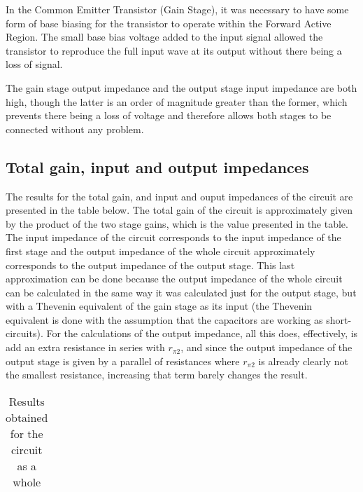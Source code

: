 In the Common Emitter Transistor (Gain Stage), it was necessary to have some form of base biasing for the transistor to operate within the Forward Active Region. The small base bias voltage added to the input signal allowed the transistor to reproduce the full input wave at its output without there being a loss of signal.

The gain stage output impedance and the output stage input impedance are both high, though the latter is an order of magnitude greater than the former, which prevents there being a loss of voltage and therefore allows both stages to be connected without any problem.



\subsection{Total gain, input and output impedances}

The results for the total gain, and input and ouput impedances of the circuit are presented in the table below. The total gain of the circuit is approximately given by the product of the two stage gains, which is the value presented in the table. The input impedance of the circuit corresponds to the input impedance of the first stage and the output impedance of the whole circuit approximately corresponds to the output impedance of the output stage.
This last approximation can be done because the output impedance of the whole circuit can be calculated in the same way it was calculated just for the output stage, but with a Thevenin equivalent of the gain stage as its input (the Thevenin equivalent is done with the assumption that the capacitors are working as short-circuits). For the calculations of the output impedance, all this does, effectively, is add an extra resistance in series with $r_{\pi2}$, and since the output impedance of the output stage is given by a parallel of resistances where $r_{\pi2}$ is already clearly not the smallest resistance, increasing that term barely changes the result.

\begin{table}[H]
  \centering
  \begin{tabular}{|c|c|}
    \hline
      
  \end{tabular}
  \caption{Results obtained for the circuit as a whole}
  \label{tab:resultsAC2}
\end{table}

